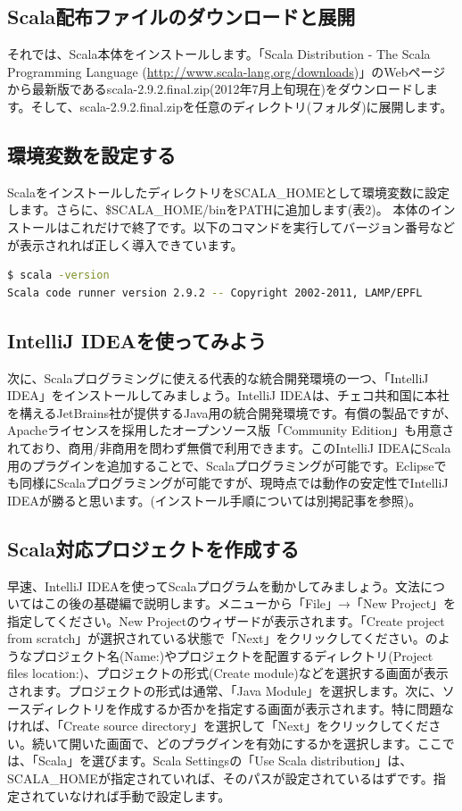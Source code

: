 \subsection{Scala配布ファイルのダウンロードと展開}
それでは、Scala本体をインストールします。「Scala Distribution - The Scala Programming Language (\url{http://www.scala-lang.org/downloads})」のWebページから最新版であるscala-2.9.2.final.zip(2012年7月上旬現在)をダウンロードします。そして、scala-2.9.2.final.zipを任意のディレクトリ(フォルダ)に展開します。
\subsection{環境変数を設定する}
ScalaをインストールしたディレクトリをSCALA\_HOMEとして環境変数に設定します。さらに、\$SCALA\_HOME/binをPATHに追加します(表2)。 本体のインストールはこれだけで終了です。以下のコマンドを実行してバージョン番号などが表示されれば正しく導入できています。

\begin{lstlisting}[language=bash, frame=none]
$ scala -version
Scala code runner version 2.9.2 -- Copyright 2002-2011, LAMP/EPFL
\end{lstlisting}

\subsection{IntelliJ IDEAを使ってみよう}
次に、Scalaプログラミングに使える代表的な統合開発環境の一つ、「IntelliJ IDEA」をインストールしてみましょう。IntelliJ IDEAは、チェコ共和国に本社を構えるJetBrains社が提供するJava用の統合開発環境です。有償の製品ですが、Apacheライセンスを採用したオープンソース版「Community Edition」も用意されており、商用/非商用を問わず無償で利用できます。このIntelliJ IDEAにScala用のプラグインを追加することで、Scalaプログラミングが可能です。Eclipseでも同様にScalaプログラミングが可能ですが、現時点では動作の安定性でIntelliJ IDEAが勝ると思います。(インストール手順については別掲記事を参照)。

\subsection{Scala対応プロジェクトを作成する}
早速、IntelliJ IDEAを使ってScalaプログラムを動かしてみましょう。文法についてはこの後の基礎編で説明します。メニューから「File」→「New Project」を指定してください。New Projectのウィザードが表示されます。「Create project from scratch」が選択されている状態で「Next」をクリックしてください。のようなプロジェクト名(Name:)やプロジェクトを配置するディレクトリ(Project files location:)、プロジェクトの形式(Create module)などを選択する画面が表示されます。プロジェクトの形式は通常、「Java Module」を選択します。次に、ソースディレクトリを作成するか否かを指定する画面が表示されます。特に問題なければ、「Create source directory」を選択して「Next」をクリックしてください。続いて開いた画面で、どのプラグインを有効にするかを選択します。ここでは、「Scala」を選びます。Scala Settingsの「Use Scala distribution」は、SCALA\_HOMEが指定されていれば、そのパスが設定されているはずです。指定されていなければ手動で設定します。

